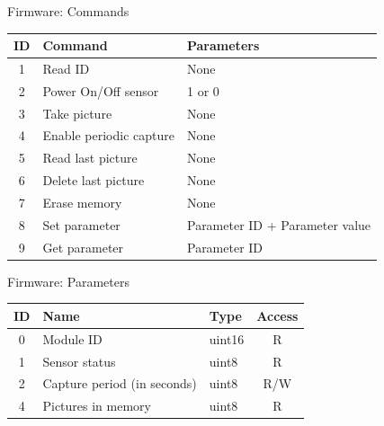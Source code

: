 
\begin{frame}{Firmware: Commands}

\begin{table}[!htb]
    \centering
    \label{tab:commands}
    \begin{tabular}{cll}
        \toprule[1.5pt]
        \textbf{ID} & \textbf{Command} & \textbf{Parameters}\\
        \midrule
        1 & Read ID                 & None \\
        2 & Power On/Off sensor     & 1 or 0 \\
        3 & Take picture            & None \\
        4 & Enable periodic capture & None \\
        5 & Read last picture       & None \\
        6 & Delete last picture     & None \\
        7 & Erase memory            & None \\
        8 & Set parameter           & Parameter ID + Parameter value \\
        9 & Get parameter           & Parameter ID \\
        \bottomrule[1.5pt]
    \end{tabular}
\end{table}

\end{frame}

\begin{frame}{Firmware: Parameters}

\begin{table}[!htb]
    \centering
    \label{tab:parameters}
    \begin{tabular}{cllc}
        \toprule[1.5pt]
        \textbf{ID} & \textbf{Name} & \textbf{Type} & \textbf{Access} \\
        \midrule
        0 & Module ID                   & uint16 & R\\
        1 & Sensor status               & uint8  & R  \\
        2 & Capture period (in seconds) & uint8  & R/W \\
        4 & Pictures in memory          & uint8  & R \\
        \bottomrule[1.5pt]
    \end{tabular}
\end{table}

\end{frame}

